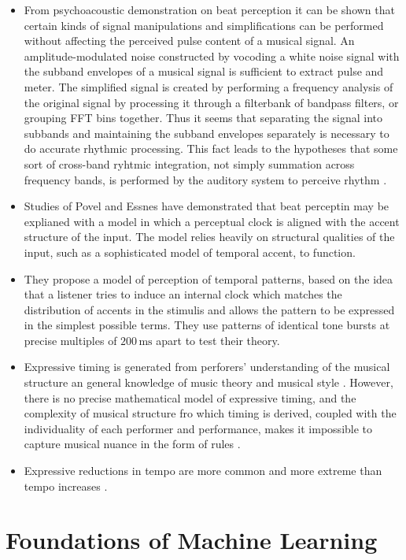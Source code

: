 \documentclass{scrartcl}
\begin{document}
\begin{itemize}
\item From psychoacoustic demonstration on beat perception it can be shown that certain kinds of signal manipulations and simplifications can be performed without affecting the perceived pulse content of a musical signal. An amplitude-modulated noise constructed by vocoding a white noise signal with the subband envelopes of a musical signal is sufficient to extract pulse and meter. The simplified signal is created by performing a frequency analysis of the original signal by processing it through a filterbank of bandpass filters, or grouping FFT bins together. Thus it seems that separating the signal into subbands and maintaining the subband envelopes separately is necessary to do accurate rhythmic processing. This fact leads to the hypotheses that some sort of cross-band ryhtmic integration, not simply summation across frequency bands, is performed by the auditory system to perceive rhythm \cite{Scheirer1998}.
\item Studies of Povel and Essnes \cite{Povel1985} have demonstrated that beat perceptin may be explianed with a model in which a perceptual clock is aligned with the accent structure of the input. The model relies heavily on structural qualities of the input, such as a sophisticated model of temporal accent, to function.
\item They propose a model of perception of temporal patterns, based on the idea that a listener tries to induce an internal clock which matches the distribution of accents in the stimulis and allows the pattern to be expressed in the simplest possible terms. They use patterns of identical tone bursts at precise multiples of $200\, \text{ms}$ apart to test their theory. 
\item Expressive timing is generated from perforers' understanding of the musical structure an general knowledge of music theory and musical style \cite{Clarke1999}. However, there is no precise mathematical model of expressive timing, and the complexity of musical structure fro which timing is derived, coupled with the individuality of each performer and performance, makes it impossible to capture musical nuance in the form of rules \cite{Dixon2001}. 
\item Expressive reductions in tempo are more common and more extreme than tempo increases \cite{Repp1994}. %
\end{itemize}


\newpage
\section{Foundations of Machine Learning}
\end{document}
